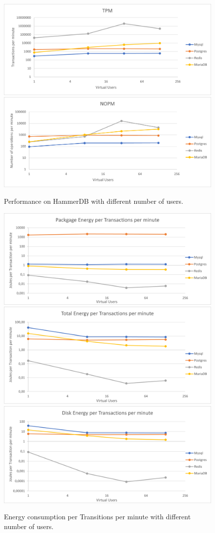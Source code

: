\begin{figure}[h!]
\centering
\caption{Performance on HammerDB with different number of users.}
\includegraphics[width=0.76\columnwidth]{results/vu/TPM.png}
\includegraphics[width=0.76\columnwidth]{results/vu/NOPM.png}
\label{fig:vuhammer}	
\end{figure}

\begin{figure}[h!]
\centering
\caption{Energy consumption per Transitions per minute with different number of users.}
\includegraphics[width=0.76\columnwidth]{results/vu/package-tpm.png}
\includegraphics[width=0.76\columnwidth]{results/vu/total-tpm.png}
\includegraphics[width=0.76\columnwidth]{results/vu/Disk-tpm.png}
\label{fig:vuyenergytpm}	
\end{figure}

